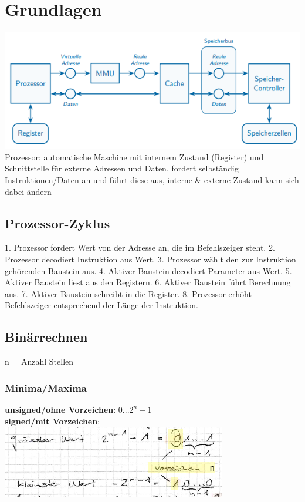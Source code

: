 \section{Grundlagen}
\includegraphics[width = \columnwidth]{grafiken/computer_grundaufbau.png}
Prozessor: automatische Maschine mit internem Zustand (Register) und Schnittstelle für externe Adressen und Daten, fordert selbständig Instruktionen/Daten an und führt diese aus, interne \& externe Zustand kann sich dabei ändern 

\subsection{Prozessor-Zyklus}
1. Prozessor fordert Wert von der Adresse an, die im Befehlszeiger steht.
2. Prozessor decodiert Instruktion aus Wert.
3. Prozessor wählt den zur Instruktion gehörenden Baustein aus.
4. Aktiver Baustein decodiert Parameter aus Wert.
5. Aktiver Baustein liest aus den Registern.
6. Aktiver Baustein führt Berechnung aus.
7. Aktiver Baustein schreibt in die Register.
8. Prozessor erhöht Befehlszeiger entsprechend der Länge der Instruktion.

\subsection{Binärrechnen}
n = Anzahl Stellen

\subsubsection{Minima/Maxima}
\textbf{unsigned/ohne Vorzeichen}: $0...2^{n}-1$\\
\textbf{signed/mit Vorzeichen}:\\
\includegraphics[scale = .75]{grafiken/zweierkomplement1.PNG}
